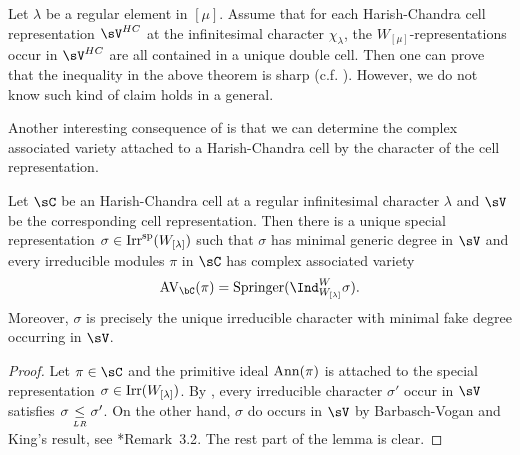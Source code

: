 \documentclass[counting_main.tex]{subfiles}
\begin{document}



\begin{remark}\label{r46}

  Let $\lambda$ be a regular element in $[\mu]$. Assume that for each
  Harish-Chandra cell representation $\sV^{HC}$ at the infinitesimal character
  $\chi_{\lambda}$, the $W_{[\mu]}$-representations occur in $\sV^{HC}$ are all
  contained in a unique double cell. Then one can prove that the inequality in
  the above theorem is sharp (c.f. \cite{BV.W}). However, we do not know such
  kind of claim holds in a general.
\end{remark}


Another interesting consequence of  is that we can determine
the complex associated variety attached to a Harish-Chandra cell by the
character of the cell representation.

\begin{lem}\label{lem:AV.HC}
  Let $\sC$ be an Harish-Chandra cell at a regular infinitesimal character
  $\lambda$ and $\sV$ be the corresponding cell representation.  Then there is a unique
  special representation $\sigma\in \mathrm{Irr}^{\text{sp}}(W_{[\lambda]})$ such that $\sigma$
  has minimal generic degree in $\sV$ and every irreducible modules $\pi$ in
  $\sC$ has complex associated variety
  \[
    \AVC(\pi) = \Spr(\Ind_{W_{[\lambda]}}^{W}\sigma).
  \]
  Moreover, $\sigma$ is precisely the unique irreducible character
  with minimal fake degree occurring in $\sV$.
\end{lem}
\begin{proof}
  Let $\pi\in \sC$ and the primitive ideal $\operatorname{Ann}(\pi)$ is attached to the
  special representation $\sigma \in \mathrm{Irr}(W_{[\lambda]})$.
  By , every irreducible character $\sigma'$ occur in
  $\sV$ satisfies $\sigma \mathrel{\mathop{\leq}\limits_{\scriptscriptstyle LR}} \sigma'$.
  On the other hand, $\sigma$ do occurs in $\sV$ by Barbasch-Vogan and King's
  result, see \cite{Cas}*{Remark~3.2}.
  The rest part of the lemma is clear.
\end{proof}
\end{document}
